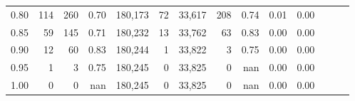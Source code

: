 \begin{tabular}{rrrrrrrrrrrrrr}
0.80 &     114 &    260 &  0.70 &  180,173 &       72 &  33,617 &     208 &  0.74 &  0.01 &      0.00 \\
0.85 &      59 &    145 &  0.71 &  180,232 &       13 &  33,762 &      63 &  0.83 &  0.00 &      0.00 \\
0.90 &      12 &     60 &  0.83 &  180,244 &        1 &  33,822 &       3 &  0.75 &  0.00 &      0.00 \\
0.95 &       1 &      3 &  0.75 &  180,245 &        0 &  33,825 &       0 &   nan &  0.00 &      0.00 \\
1.00 &       0 &      0 &   nan &  180,245 &        0 &  33,825 &       0 &   nan &  0.00 &      0.00 \\
\bottomrule
\end{tabular}
